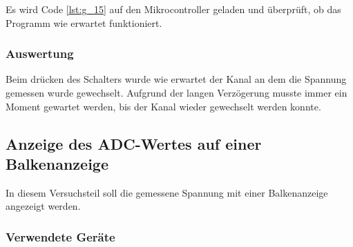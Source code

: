 \documentclass[12pt,a4paper]{article}
\begin{document}
Es wird Code \ref{lst:g_15} auf den Mikrocontroller geladen und überprüft, ob das Programm wie erwartet funktioniert.

\subsubsection*{Auswertung}

Beim drücken des Schalters wurde wie erwartet der Kanal an dem die Spannung gemessen wurde gewechselt. Aufgrund der langen Verzögerung musste immer ein Moment gewartet werden, bis der Kanal wieder gewechselt werden konnte.

\subsection{Anzeige des ADC-Wertes auf einer Balkenanzeige}

In diesem Versuchsteil soll die gemessene Spannung mit einer Balkenanzeige angezeigt werden.

\subsubsection*{Verwendete Geräte}
\end{document}
